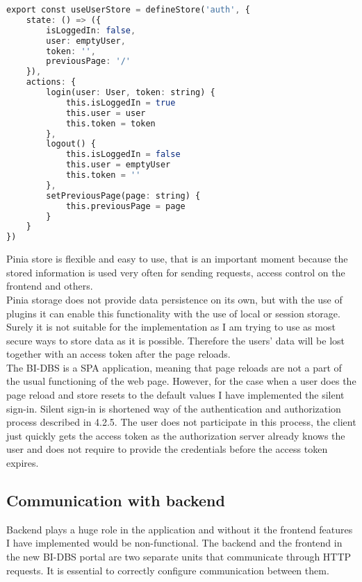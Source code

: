 \begin{lstlisting}[language=Octave, caption=Pinia store configuration for user states]
export const useUserStore = defineStore('auth', {
    state: () => ({
        isLoggedIn: false,
        user: emptyUser,
        token: '',
        previousPage: '/'
    }),
    actions: {
        login(user: User, token: string) {
            this.isLoggedIn = true
            this.user = user
            this.token = token
        },
        logout() {
            this.isLoggedIn = false
            this.user = emptyUser
            this.token = ''
        },
        setPreviousPage(page: string) {
            this.previousPage = page
        }
    }
})
\end{lstlisting}


\noindent Pinia store is flexible and easy to use, that is an important moment because the stored information is used very often for sending requests, access control on the frontend and others.\\
Pinia storage does not provide data persistence on its own, but with the use of plugins it can enable this functionality with the use of local or session storage. Surely it is not suitable for the implementation as I am trying to use as most secure ways to store data as it is possible. Therefore the users' data will be lost together with an access token after the page reloads.\\
The BI-DBS is a SPA application, meaning that page reloads are not a part of the usual functioning of the web page. However, for the case when a user does the page reload and store resets to the default values I have implemented the silent sign-in. Silent sign-in is shortened way of the authentication and authorization process described in 4.2.5. The user does not participate in this process, the client just quickly gets the access token as the authorization server already knows the user and does not require to provide the credentials before the access token expires.





\subsection{Communication with backend} Backend plays a huge role in the application and without it the frontend features I have implemented  would be non-functional. The backend and the frontend in the new BI-DBS portal are two separate units that communicate through HTTP requests. It is essential to correctly configure communication between them.

